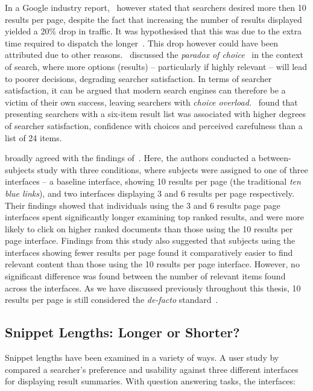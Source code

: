 In a Google industry report,~\cite{linden2006} however stated that searchers desired more then 10 results per page, despite the fact that increasing the number of results displayed yielded a 20\% drop in traffic. It was hypothesised that this was due to the extra time required to dispatch the longer~. This drop however could have been attributed due to other reasons.~\cite{oulasvirta2009serp_size} discussed the \emph{paradox of choice}~\citep{schwartz2005paradox_of_choice} in the context of search, where more options (results) -- particularly if highly relevant -- will lead to poorer decisions, degrading searcher satisfaction. In terms of searcher satisfaction, it can be argued that modern search engines can therefore be a victim of their own success, leaving searchers with \emph{choice overload.}~\cite{oulasvirta2009serp_size} found that presenting searchers with a six-item result list was associated with higher degrees of searcher satisfaction, confidence with choices and perceived carefulness than a list of 24 items.

\cite{kelly2015serp_size} broadly agreed with the findings of~\cite{oulasvirta2009serp_size}. Here, the authors conducted a between-subjects study with three conditions, where subjects were assigned to one of three interfaces -- a baseline interface, showing 10 results per page (the traditional \emph{ten blue links}), and two interfaces displaying 3 and 6 results per page respectively. Their findings showed that individuals using the 3 and 6 results page page interfaces spent significantly longer examining top ranked results, and were more likely to click on higher ranked documents than those using the 10 results per page interface. Findings from this study also suggested that subjects using the interfaces showing fewer results per page found it comparatively easier to find relevant content than those using the 10 results per page interface. However, no significant difference was found between the number of relevant items found across the interfaces. As we have discussed previously throughout this thesis, 10 results per page is still considered the \emph{de-facto} standard~\citep{hearst2009_search}.

\subsection{Snippet Lengths: Longer or Shorter?}
Snippet lengths have been examined in a variety of ways. A user study by~\cite{paek2004wavelens} compared a searcher's preference and usability against three different interfaces for displaying result summaries. With question answering tasks, the interfaces:

